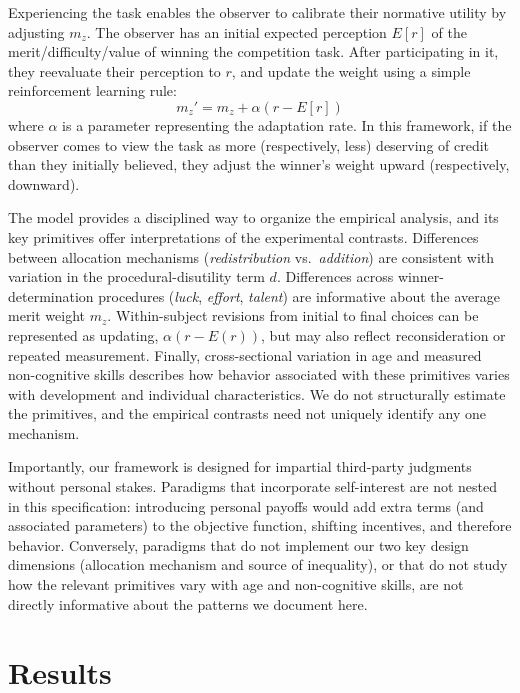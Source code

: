 \documentclass[11pt]{article}
\begin{document}
 

Experiencing the task enables the observer to calibrate their normative utility by adjusting $m_z$. The observer has an initial expected perception $E[r]$ of the merit/difficulty/value of winning the competition task. After participating in it, they reevaluate their perception to $r$, and update the weight using a simple  reinforcement learning rule:
\[
m_z'=m_z+\alpha(r-E[r]) 
\]
where $\alpha$ is a parameter representing the adaptation rate. In this framework, if the observer comes to view the task as more (respectively, less) deserving of credit than they initially believed, they adjust the winner’s weight upward (respectively, downward). 



The model provides a disciplined way to organize the empirical analysis, and its key primitives offer interpretations of the experimental contrasts. Differences between allocation mechanisms (\emph{redistribution\/} vs.\ \emph{addition}) are consistent with variation in the procedural-disutility term $d$. Differences across winner-determination procedures (\emph{luck}, \emph{effort}, \emph{talent}) are informative about the average merit weight $m_z$. Within-subject revisions from initial to final choices can be represented as updating, $\alpha(r-E(r))$, but may also reflect reconsideration or repeated measurement. Finally, cross-sectional variation in age and measured non-cognitive skills describes how behavior associated with these primitives varies with development and individual characteristics. We do not structurally estimate the primitives, and the empirical contrasts need not uniquely identify any one mechanism.

Importantly, our framework is designed for impartial third-party judgments without personal stakes. Paradigms that incorporate self-interest are not nested in this specification: introducing personal payoffs would add extra terms (and associated parameters) to the objective function, shifting incentives, and therefore behavior. Conversely, paradigms that do not implement our two key design dimensions (allocation mechanism and source of inequality), or that do not study how the relevant primitives vary with age and non-cognitive skills, are not directly informative about the patterns we document here.

 
\section{Results \label{sec-results}}
\end{document}
